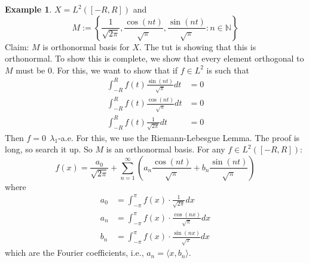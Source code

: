 \documentclass[11pt,a4paper]{article}
\theoremstyle{definition}
\newtheorem{example}{Example}[section]
\begin{document}
\begin{example} 
    $X = L^2([-R,R])$ and \[M := \left \{\frac{1}{\sqrt{2\pi}}, \frac{\cos (nt)}{\sqrt{\pi}}, \frac{\sin (nt)}{\sqrt{\pi}} : n \in \mathbb{N}\right \}\]
    Claim: $M$ is orthonormal basis for $X$. The tut is showing that this is orthonormal. To show this is complete, we show that every element orthogonal to $M$ must be $0$. For this, we want to show that if $f \in L^2$ is such that 
    \begin{align*}
        \int _{-R}^R f(t) \frac{\sin (nt)}{\sqrt{\pi }}dt & = 0 \\
        \int _{-R}^R f(t) \frac{\cos (nt)}{\sqrt{\pi }}dt & = 0 \\
        \int _{-R}^R f(t) \frac{1}{\sqrt{2\pi }}dt & = 0
    \end{align*} 
    Then $f = 0 \ \ \lambda_1$-a.e. For this, we use the Riemann-Lebesgue Lemma. The proof is long, so search it up. So $M$ is an orthonormal basis. For any $f \in L^2([-R, R])$:
\[
f(x) = \frac{a_0}{\sqrt{2\pi}}
+ \sum_{n=1}^{\infty} \left( a_n \frac{\cos(nt)}{\sqrt{\pi}} + b_n \frac{\sin(nt)}{\sqrt{\pi}} \right)
\]
where
\begin{align*}
a_0 &= \int_{-\pi}^\pi f(x) \cdot \frac{1}{\sqrt{2\pi}} dx \\
a_n &= \int_{-\pi}^\pi f(x) \cdot \frac{\cos(nx)}{\sqrt{\pi}} dx \\
b_n &= \int_{-\pi}^\pi f(x) \cdot \frac{\sin(nx)}{\sqrt{\pi}} dx
\end{align*}
which are the Fourier coefficients, i.e., $a_n = \langle x, b_n \rangle$.
\end{example}
\end{document}
